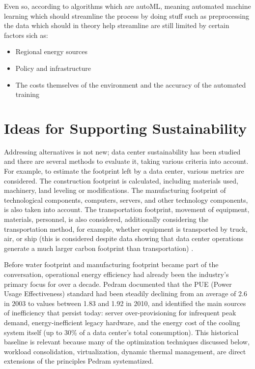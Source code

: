 \documentclass[conference]{IEEEtran}
\begin{document}
Even so, according to \cite{Schmitt2024} algorithms which are autoML, meaning automated machine learning which should streamline the process by doing stuff such as preprocessing the data which should in theory help streamline are still limited by certain factors sich as:
\begin{itemize}
    \item Regional energy sources
    \item Policy and infrastructure
    \item The costs themselves of the environment and the accuracy of the automated training
\end{itemize}

\section{Ideas for Supporting Sustainability}

Addressing alternatives is not new; data center sustainability has been studied and there are several methods to evaluate it, taking various criteria into account. For example, to estimate the footprint left by a data center, various metrics are considered. The construction footprint is calculated, including materials used, machinery, land leveling or modifications. The manufacturing footprint of technological components, computers, servers, and other technology components, is also taken into account. The transportation footprint, movement of equipment, materials, personnel, is also considered, additionally considering the transportation method, for example, whether equipment is transported by truck, air, or ship (this is considered despite data showing that data center operations generate a much larger carbon footprint than transportation) \cite{Hankendi2026}.

Before water footprint and manufacturing footprint became part of the conversation, operational energy efficiency had already been the industry's primary focus for over a decade. Pedram \cite{Pedram2012} documented that the PUE (Power Usage Effectiveness) standard had been steadily declining from an average of 2.6 in 2003 to values between 1.83 and 1.92 in 2010, and identified the main sources of inefficiency that persist today: server over-provisioning for infrequent peak demand, energy-inefficient legacy hardware, and the energy cost of the cooling system itself (up to 30\% of a data center's total consumption). This historical baseline is relevant because many of the optimization techniques discussed below, workload consolidation, virtualization, dynamic thermal management, are direct extensions of the principles Pedram \cite{Pedram2012} systematized.
\end{document}
